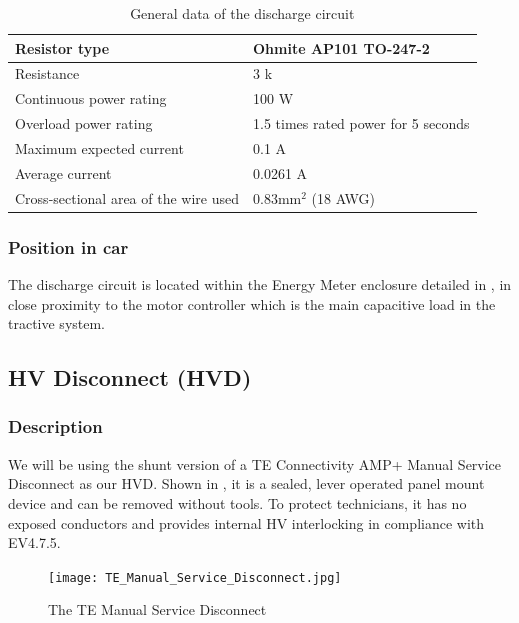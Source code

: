 \documentclass{article}
\begin{document}
	\begin{table}[H]
		\centering
		\begin{tabular}{|l|l|}
		\hline
		Resistor type & Ohmite AP101 TO-247-2 \\ \hline
		Resistance & 3 k\ohm \\ \hline
		Continuous power rating & 100 W \\ \hline
		Overload power rating & 1.5 times rated power for 5 seconds \\ \hline
		Maximum expected current & 0.1 A \\ \hline
		Average current & 0.0261 A\\ \hline
		Cross-sectional area of the wire used & 0.83mm$^2$ (18 AWG) \\ \hline
		\end{tabular}
		\caption{General data of the discharge circuit}
		\label{dctable}
	\end{table}

\subsubsection{Position in car}
The discharge circuit is located within the Energy Meter enclosure detailed in , in close proximity to the motor controller which is the main capacitive load in the tractive system. 

\subsection{HV Disconnect (HVD)}\label{hv_disconnect}
\subsubsection{Description}
We will be using the shunt version of a TE Connectivity AMP+ Manual Service Disconnect as our HVD. Shown in , it is a sealed, lever operated panel mount device and can be removed without tools. To protect technicians, it has no exposed conductors and provides internal HV interlocking in compliance with EV4.7.5. 

\begin{figure}[h]
\centering
\texttt{[image: TE\_Manual\_Service\_Disconnect.jpg]}
\caption{The TE Manual Service Disconnect}
\label{fig:TE_MSD}
\end{figure}
\end{document}
